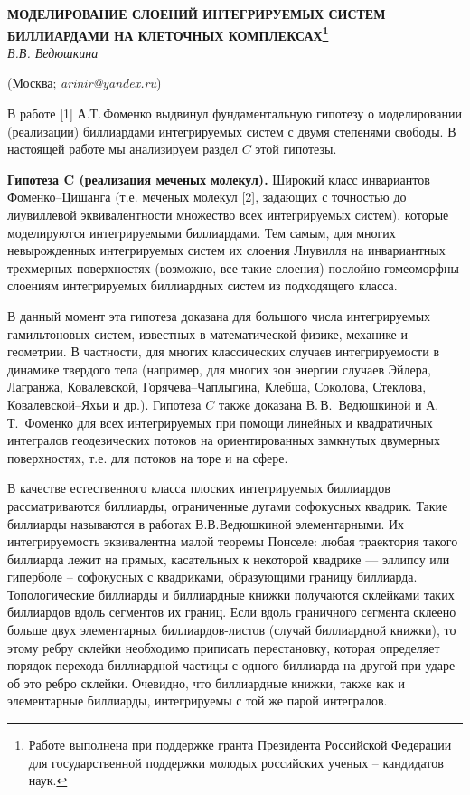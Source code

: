 \begin{center}
    {\bf МОДЕЛИРОВАНИЕ СЛОЕНИЙ ИНТЕГРИРУЕМЫХ СИСТЕМ БИЛЛИАРДАМИ НА КЛЕТОЧНЫХ КОМПЛЕКСАХ\footnote{ Работе выполнена при поддержке гранта Президента Российской Федерации для государственной поддержки молодых российских ученых – кандидатов наук.}}\\

    {\it В.В. Ведюшкина}

    (Москва; {\it arinir@yandex.ru})
\end{center}

В работе [1] А.Т.\,Фоменко выдвинул фундаментальную гипотезу о моделировании (реализации) биллиардами интегрируемых систем с двумя степенями свободы.
В настоящей работе мы анализируем раздел $C$ этой гипотезы.

\textbf{Гипотеза C (реализация меченых молекул).} Широкий класс инвариантов Фоменко--Цишанга (т.е. меченых молекул [2], задающих с точностью до лиувиллевой эквивалентности множество всех интегрируемых систем), которые моделируются интегрируемыми биллиардами. Тем самым, для многих невырожденных интегрируемых систем их слоения Лиувилля на  инвариантных
трехмерных поверхностях (возможно, все такие слоения) послойно гомеоморфны слоениям интегрируемых биллиардных систем из подходящего класса.

В данный момент эта гипотеза доказана для большого числа интегрируемых гамильтоновых систем, известных в математической физике, механике и геометрии. В частности, для многих классических случаев интегрируемости в динамике твердого тела (например, для многих зон энергии случаев Эйлера, Лагранжа, Ковалевской, Горячева--Чаплыгина, Клебша, Соколова, Стеклова, Ковалевской--Яхьи и др.). Гипотеза $C$ также доказана В.\,В.~Ведюшкиной и А.\,Т.~Фоменко для всех интегрируемых при помощи линейных и квадратичных интегралов геодезических потоков на ориентированных замкнутых двумерных поверхностях, т.е. для потоков на торе и на сфере.

 В качестве естественного класса плоских интегрируемых биллиардов рассматриваются биллиарды, ограниченные дугами софокусных квадрик. Такие биллиарды называются в работах В.В.Ведюшкиной элементарными. Их интегрируемость эквивалентна малой теоремы Понселе: любая траектория такого биллиарда лежит на прямых, касательных к некоторой квадрике --- эллипсу или  гиперболе -- софокусных с квадриками, образующими границу биллиарда. Топологические биллиарды и биллиардные книжки получаются склейками таких биллиардов вдоль сегментов их границ. Если вдоль граничного сегмента склеено больше двух элементарных биллиардов-листов (случай биллиардной книжки), то этому ребру склейки необходимо приписать перестановку, которая определяет порядок перехода биллиардной частицы с одного биллиарда на другой при ударе об это ребро склейки. Очевидно, что биллиардные книжки, также как и элементарные биллиарды, интегрируемы с той же парой интегралов.


